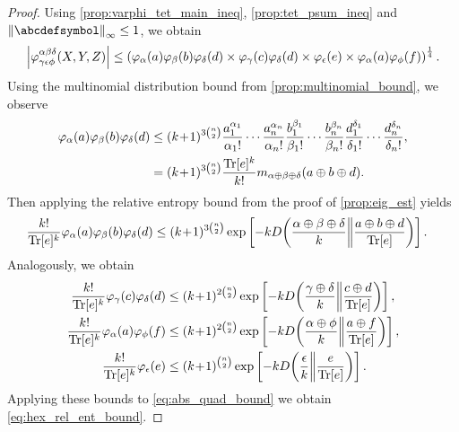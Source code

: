 \documentclass[notitlepage, 11pt, letterpaper]{amsart}
\begin{document}
\begin{proof}
    Using \cref{prop:varphi_tet_main_ineq}, \cref{prop:tet_psum_ineq} and $\norm{\abcdefsymbol}_{\infty} \leq 1$, we obtain
    \begin{equation}
        \label{eq:abs_quad_bound}
        \left|\varphi^{\alpha\beta\delta}_{\gamma\epsilon\phi}(X,Y,Z)\right|
        \leq
        \left(\varphi_{\alpha}(a)\varphi_{\beta}(b)\varphi_{\delta}(d) \times \varphi_{\gamma}(c)\varphi_{\delta}(d) \times \varphi_{\epsilon}(e) \times \varphi_{\alpha}(a)\varphi_{\phi}(f)\right)^{\frac{1}{4}}.
    \end{equation}
    Using the multinomial distribution bound from \cref{prop:multinomial_bound}, we observe
    \begin{align}
        \begin{split}
            \varphi_{\alpha}(a)\varphi_{\beta}(b)\varphi_{\delta}(d)
            &\leq (k\!+\!1)^{3\binom{n}{2}}
            \frac{a_1^{\alpha_1}}{\alpha_1!}\cdots\frac{a_n^{\alpha_n}}{\alpha_n!}
            \frac{b_1^{\beta_1}}{\beta_1!}\cdots\frac{b_n^{\beta_n}}{\beta_n!}
            \frac{d_1^{\delta_1}}{\delta_1!}\cdots\frac{d_n^{\delta_n}}{\delta_n!}, \\
            &= (k\!+\!1)^{3\binom{n}{2}} \frac{\operatorname{Tr}[e]^{k}}{k!}
            m_{\alpha \oplus \beta \oplus \delta}(a \oplus b \oplus d).
        \end{split}
    \end{align}
    Then applying the relative entropy bound from the proof of \cref{prop:eig_est} yields
    \begin{align}
        \frac{k!}{\operatorname{Tr}[e]^k}{\varphi_{\alpha}(a)\varphi_{\beta}(b)\varphi_{\delta}(d)}
        &\leq (k\!+\!1)^{3\binom{n}{2}}\exp\left[ - k D\!\left(\frac{\alpha \oplus \beta \oplus \delta}{k}\middle\|\frac{a\oplus b \oplus d}{\operatorname{Tr}[e]}\right)\right].
    \end{align}
    Analogously, we obtain
    \begin{align}
        \frac{k!}{\tee^k}{\vp_{\yc}(\ec)\vp_{\yd}(\ed)}
        &\leq\polyk{2\binom{n}{2}} \exp\left[ - k \kl{\frac{\yc \oplus \yd}{k}}{\frac{\ec \oplus \ed}{\tee}}\right], \\
        \frac{k!}{\tee^k}{\vp_{\ya}(\ea)\vp_{\yf}(\ef)}
        &\leq\polyk{2\binom{n}{2}}\exp\left[ - k \kl{\frac{\ya \oplus \yf}{k}}{\frac{\ea\oplus \ef}{\tee}}\right], \\
        \frac{k!}{\tee^k}{\vp_{\ye}(\ee)}
        &\leq\polyk{\binom{n}{2}}\exp\left[ - k \kl{\frac{\ye}{k}}{\frac{\ee}{\tee}}\right].
    \end{align}
    Applying these bounds to \cref{eq:abs_quad_bound} we obtain \cref{eq:hex_rel_ent_bound}.
\end{proof}
\end{document}

